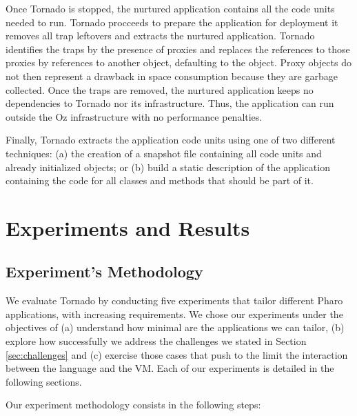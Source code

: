Once Tornado is stopped, the nurtured application contains all the code units needed to run. Tornado procceeds to prepare the application for deployment \ie it removes all trap leftovers and extracts the nurtured application. Tornado identifies the traps by the presence of proxies and replaces the references to those proxies by references to another object, defaulting to the  object. Proxy objects do not then represent a drawback in space consumption because they are garbage collected. Once the traps are removed, the nurtured application keeps no dependencies to Tornado nor its infrastructure. Thus, the application can run outside the Oz infrastructure with no performance penalties.

Finally, Tornado extracts the application code units using one of two different techniques: (a) the creation of a snapshot file containing all code units and already initialized objects; or (b) build a static description of the application containing the code for all classes and methods that should be part of it.


\section{Experiments and Results}\label{sec:results}

\subsection{Experiment's Methodology}
We evaluate Tornado by conducting five experiments that tailor different Pharo applications, with increasing requirements. We chose our experiments under the objectives of (a) understand how minimal are the applications we can tailor, (b) explore how successfully we address the challenges we stated in Section \ref{sec:challenges} and (c) exercise those cases that push to the limit the interaction between the language and the VM. Each of our experiments is detailed in the following sections.

Our experiment methodology consists in the following steps:

